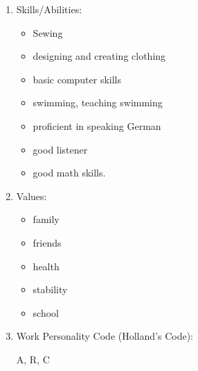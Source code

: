\begin{enumerate}[leftmargin=*]
\begin{multicols}{2}
\begin{itemize}
\item watching movies with friends
\item reading mystery books
\item swimming
\item listening to punk rock music
\item camping with friends
\item going to concerts
\item doing research
\item clothing design
\item computers.
\end{itemize}\end{multicols}
\item Skills/Abilities:
\begin{multicols}{2}\begin{itemize}
\item Sewing
\item designing and creating clothing
\item basic computer skills
\item swimming, teaching swimming
\item proficient in speaking German
\item good listener
\item good math skills.
\end{itemize}\end{multicols}
\item Values: 
\begin{multicols}{2}\begin{itemize}
\item family
\item friends
\item health
\item stability
\item school\end{itemize}\end{multicols}
\item Work Personality Code (Holland's Code): 

A, R, C
\end{enumerate}
